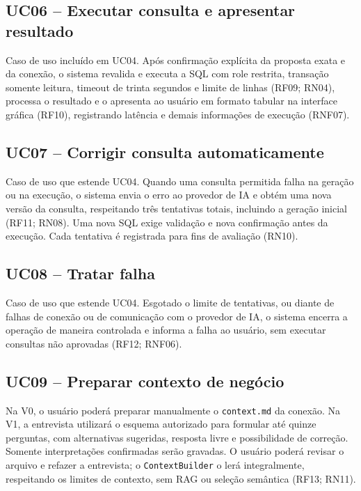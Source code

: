 \begin{apendicesenv}
\subsection{UC06 -- Executar consulta e apresentar resultado}

Caso de uso incluído em UC04. Após confirmação explícita da proposta exata e da conexão, o sistema revalida e executa a SQL com role restrita, transação somente leitura, timeout de trinta segundos e limite de linhas (RF09; RN04), processa o resultado e o apresenta ao usuário em formato tabular na interface gráfica (RF10), registrando latência e demais informações de execução (RNF07).

\subsection{UC07 -- Corrigir consulta automaticamente}

Caso de uso que estende UC04. Quando uma consulta permitida falha na geração ou na execução, o sistema envia o erro ao provedor de IA e obtém uma nova versão da consulta, respeitando três tentativas totais, incluindo a geração inicial (RF11; RN08). Uma nova SQL exige validação e nova confirmação antes da execução. Cada tentativa é registrada para fins de avaliação (RN10).

\subsection{UC08 -- Tratar falha}

Caso de uso que estende UC04. Esgotado o limite de tentativas, ou diante de falhas de conexão ou de comunicação com o provedor de IA, o sistema encerra a operação de maneira controlada e informa a falha ao usuário, sem executar consultas não aprovadas (RF12; RNF06).

\subsection{UC09 -- Preparar contexto de negócio}

Na V0, o usuário poderá preparar manualmente o \texttt{context.md} da conexão. Na V1, a entrevista utilizará o esquema autorizado para formular até quinze perguntas, com alternativas sugeridas, resposta livre e possibilidade de correção. Somente interpretações confirmadas serão gravadas. O usuário poderá revisar o arquivo e refazer a entrevista; o \texttt{ContextBuilder} o lerá integralmente, respeitando os limites de contexto, sem RAG ou seleção semântica (RF13; RN11).


\end{apendicesenv}
